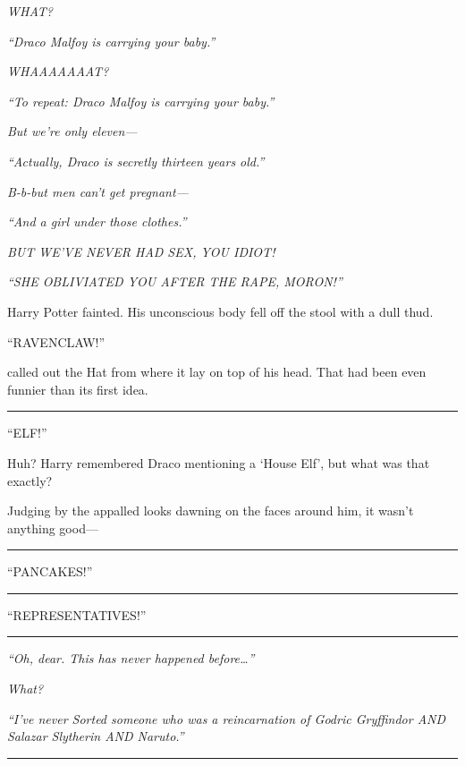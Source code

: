 \emph{WHAT?}

\emph{``Draco Malfoy is carrying your baby.''}

\emph{WHAAAAAAAT?}

\emph{``To repeat: Draco Malfoy is carrying your baby.''}

\emph{But we're only eleven---}

\emph{``Actually, Draco is secretly thirteen years old.''}

\emph{B-b-but men can't get pregnant---}

\emph{``And a girl under those clothes.''}

\emph{BUT WE'VE NEVER HAD SEX, YOU IDIOT!}

\emph{``SHE OBLIVIATED YOU AFTER THE RAPE, MORON!''}

Harry Potter fainted. His unconscious body fell off the stool with a
dull thud.

``RAVENCLAW!''

called out the Hat from where it lay on top of his head. That had been
even funnier than its first idea.

\begin{center}\rule{3in}{0.4pt}\end{center}

``ELF!''

Huh? Harry remembered Draco mentioning a `House Elf', but what was that
exactly?

Judging by the appalled looks dawning on the faces around him, it wasn't
anything good---

\begin{center}\rule{3in}{0.4pt}\end{center}

``PANCAKES!''

\begin{center}\rule{3in}{0.4pt}\end{center}

``REPRESENTATIVES!''

\begin{center}\rule{3in}{0.4pt}\end{center}

\emph{``Oh, dear. This has never happened before\ldots{}''}

\emph{What?}

\emph{``I've never Sorted someone who was a reincarnation of Godric
Gryffindor AND Salazar Slytherin AND Naruto.''}

\begin{center}\rule{3in}{0.4pt}\end{center}

